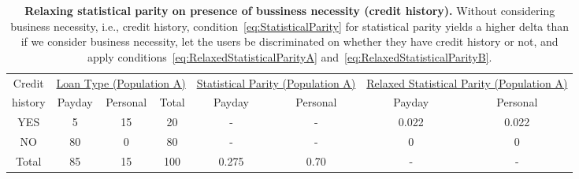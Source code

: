 \begin{table*}[t]
{ \small
  \center
  \renewcommand{\arraystretch}{1.5}
  \begin{tabular}{ c | c c c | c c | c c}
    Credit
    & \multicolumn{3}{|c|}{\underline{Loan Type (Population A)}}
    & \multicolumn{2}{|c}{\underline{Statistical Parity (Population A) }}
    & \multicolumn{2}{|c}{\underline{Relaxed Statistical Parity (Population A) }} \\
    history & Payday & Personal & Total & Payday & Personal & Payday & Personal \\
    \hline
    YES & 5  & 15 & 20 & - & - &  0.022 & 0.022 \\
    NO  & 80 & 0  & 80 & - & - &  0    & 0 \\
    \hline
    Total & 85 & 15 & 100 & 0.275 & 0.70 & - & - \\
  \end{tabular}
  \label{tab:BusinessNessecityA}
  \caption{{\bf Relaxing statistical parity on presence of bussiness necessity (credit history).}
    Without considering business necessity, i.e., credit history,
    condition~\ref{eq:StatisticalParity} for statistical parity yields a higher delta than if we
    consider business necessity, let the users be discriminated on whether they have credit
    history or not, and apply conditions~\ref{eq:RelaxedStatisticalParityA}
    and~\ref{eq:RelaxedStatisticalParityB}.}
} \end{table*}


